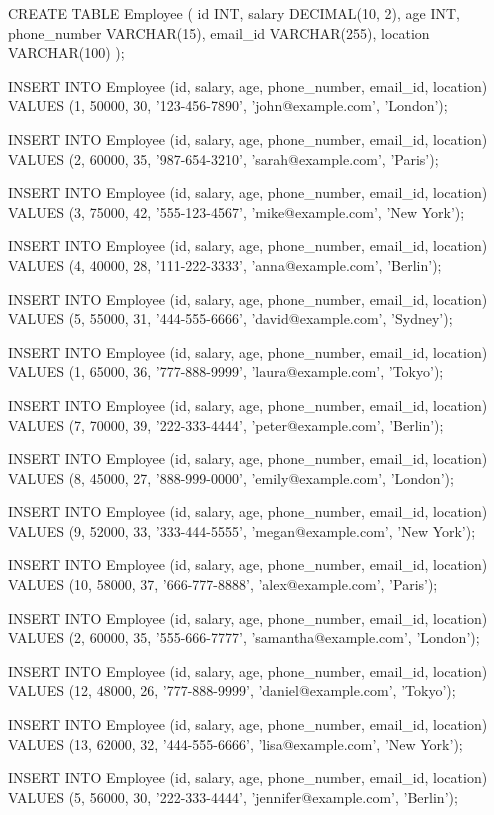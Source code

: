CREATE TABLE Employee (
    id INT,
    salary DECIMAL(10, 2),
    age INT,
    phone_number VARCHAR(15),
    email_id VARCHAR(255),
    location VARCHAR(100)
);

INSERT INTO Employee (id, salary, age, phone_number, email_id, location)
VALUES (1, 50000, 30, '123-456-7890', 'john@example.com', 'London');

INSERT INTO Employee (id, salary, age, phone_number, email_id, location)
VALUES (2, 60000, 35, '987-654-3210', 'sarah@example.com', 'Paris');

INSERT INTO Employee (id, salary, age, phone_number, email_id, location)
VALUES (3, 75000, 42, '555-123-4567', 'mike@example.com', 'New York');

INSERT INTO Employee (id, salary, age, phone_number, email_id, location)
VALUES (4, 40000, 28, '111-222-3333', 'anna@example.com', 'Berlin');

INSERT INTO Employee (id, salary, age, phone_number, email_id, location)
VALUES (5, 55000, 31, '444-555-6666', 'david@example.com', 'Sydney');

INSERT INTO Employee (id, salary, age, phone_number, email_id, location)
VALUES (1, 65000, 36, '777-888-9999', 'laura@example.com', 'Tokyo');

INSERT INTO Employee (id, salary, age, phone_number, email_id, location)
VALUES (7, 70000, 39, '222-333-4444', 'peter@example.com', 'Berlin');

INSERT INTO Employee (id, salary, age, phone_number, email_id, location)
VALUES (8, 45000, 27, '888-999-0000', 'emily@example.com', 'London');

INSERT INTO Employee (id, salary, age, phone_number, email_id, location)
VALUES (9, 52000, 33, '333-444-5555', 'megan@example.com', 'New York');

INSERT INTO Employee (id, salary, age, phone_number, email_id, location)
VALUES (10, 58000, 37, '666-777-8888', 'alex@example.com', 'Paris');

INSERT INTO Employee (id, salary, age, phone_number, email_id, location)
VALUES (2, 60000, 35, '555-666-7777', 'samantha@example.com', 'London');

INSERT INTO Employee (id, salary, age, phone_number, email_id, location)
VALUES (12, 48000, 26, '777-888-9999', 'daniel@example.com', 'Tokyo');

INSERT INTO Employee (id, salary, age, phone_number, email_id, location)
VALUES (13, 62000, 32, '444-555-6666', 'lisa@example.com', 'New York');

INSERT INTO Employee (id, salary, age, phone_number, email_id, location)
VALUES (5, 56000, 30, '222-333-4444', 'jennifer@example.com', 'Berlin');

